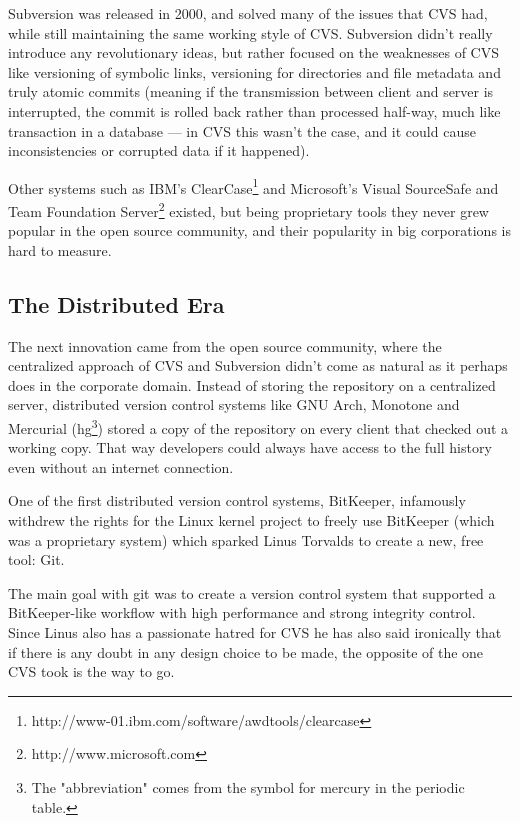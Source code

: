 \documentclass{llncs}
\begin{document}
Subversion was released in 2000, and solved many of the issues that
CVS had, while still maintaining the same working style of
CVS. Subversion didn't really introduce any revolutionary ideas, but
rather focused on the weaknesses of CVS like versioning of symbolic
links, versioning for directories and file metadata and truly atomic
commits (meaning if the transmission between client and server is
interrupted, the commit is rolled back rather than processed half-way,
much like transaction in a database\cite{subversion} --- in CVS this
wasn't the case, and it could cause inconsistencies or corrupted data
if it happened).

Other systems such as IBM's
ClearCase\footnote{http://www-01.ibm.com/software/awdtools/clearcase}
and Microsoft's Visual SourceSafe and Team Foundation
Server\footnote{http://www.microsoft.com} existed, but being
proprietary tools they never grew popular in the open source
community, and their popularity in big corporations is hard to
measure.

\subsection{The Distributed Era}

The next innovation came from the open source community, where the
centralized approach of CVS and Subversion didn't come as natural as
it perhaps does in the corporate domain. Instead of storing the
repository on a centralized server, distributed version control
systems like GNU Arch, Monotone and Mercurial (hg\footnote{ The
  "abbreviation" comes from the symbol for mercury in the periodic
  table. }) stored a copy of the repository on every client that
checked out a working copy. That way developers could always have
access to the full history even without an internet connection.

One of the first distributed version control systems, BitKeeper,
infamously withdrew the rights for the Linux kernel project to freely
use BitKeeper\cite{robert06}\cite{shaikh02} (which was a proprietary
system) which sparked Linus Torvalds to create a new, free tool: Git.

The main goal with git was to create a version control system that
supported a BitKeeper-like workflow with high performance and strong
integrity control. Since Linus also has a passionate hatred for CVS he
has also said ironically that if there is any doubt in any design
choice to be made, the opposite of the one CVS took is the way to
go\cite{torvalds07}.
\end{document}
